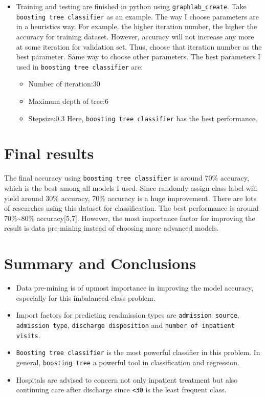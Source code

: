 \documentclass[]{article}
\begin{document}
\begin{itemize}
\itemsep1pt\parskip0pt
\item
  Training and testing are finished in python using
  \texttt{graphlab\_create}. Take \texttt{boosting tree classifier} as
  an example. The way I choose parameters are in a heuristics way. For
  example, the higher iteration number, the higher the accuracy for
  training dataset. However, accuracy will not increase any more at some
  iteration for validation set. Thus, choose that iteration number as
  the best parameter. Same way to choose other parameters. The best
  parameters I used in \texttt{boosting tree classifier} are:

  \begin{itemize}
  \itemsep1pt\parskip0pt
  \item
    Number of iteration:30
  \item
    Maximum depth of tree:6
  \item
    Stepsize:0.3 Here, \texttt{boosting tree classifier} has the best
    performance.
  \end{itemize}
\end{itemize}

\section{Final results}\label{final-results}

The final accuracy using \texttt{boosting tree classifier} is around
70\% accuracy, which is the best among all models I used. Since randomly
assign class label will yield around 30\% accuracy, 70\% accuracy is a
huge improvement. There are lots of researches using this dataset for
classification. The best performance is around 70\%\textasciitilde{}80\%
accuracy{[}5,7{]}. However, the most importance factor for improving the
result is data pre-mining instead of choosing more advanced models.

\section{Summary and Conclusions}\label{summary-and-conclusions}

\begin{itemize}
\itemsep1pt\parskip0pt
\item
  Data pre-mining is of upmost importance in improving the model
  accuracy, especially for this imbalanced-class problem.
\item
  Import factors for predicting readmission types are
  \texttt{admission source}, \texttt{admission type},
  \texttt{discharge disposition} and
  \texttt{number of inpatient visits}.
\item
  \texttt{Boosting tree classifier} is the most powerful classifier in
  this problem. In general, \texttt{boosting tree} a powerful tool in
  classification and regression.
\item
  Hospitals are advised to concern not only inpatient treatment but also
  continuing care after discharge since \texttt{\textless{}30} is the
  least frequent class.
\end{itemize}
\end{document}
